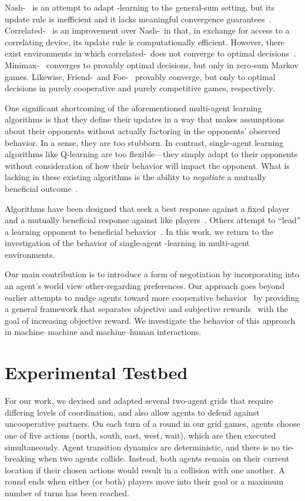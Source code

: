 \documentclass[letterpaper]{article}
\begin{document}
Nash-\Q~\cite{hu03} is an attempt to adapt \Q-learning to the
general-sum setting, but its update rule is inefficient and it lacks
meaningful convergence guarantees~\cite{bowling00,littman01d}.
Correlated-\Q~\cite{greenwald03} is an improvement over Nash-\Q\ in
that, in exchange for access to a correlating device, its update rule
is computationally efficient.  However, there exist environments in
which correlated-\Q\ does not converge to optimal
decisions~\cite{zinkevich05}.  Minimax-\Q~\cite{littman94b} converges
to provably optimal decisions, but only in zero-sum Markov games.
Likewise, Friend-\Q\ and Foe-\Q~\cite{littman01d} provably converge,
but only to optimal decisions in purely cooperative and purely
competitive games, respectively.

One significant shortcoming of the aforementioned multi-agent learning
algorithms is that they define their updates in a way that makes
assumptions about their opponents without actually factoring in the
opponents' observed behavior. In a sense, they are too stubborn. In
contrast, single-agent learning algorithms like Q-learning are too
flexible---they simply adapt to their opponents without consideration
of how their behavior will impact the opponent. What is lacking in
these existing algorithms is the ability to \emph{negotiate} a
mutually beneficial outcome~\cite{gal04}.

Algorithms have been designed that seek a best response against a
fixed player and a mutually beneficial response against like
players~\cite{conitzer07,bowling02}. Others attempt to ``lead'' a
learning opponent to beneficial behavior~\cite{littman01h}. In this
work, we return to the investigation of the behavior of
single-agent \Q-learning in multi-agent environments.

Our main contribution is to introduce a form of negotiation by
incorporating into an agent's world view other-regarding preferences.
Our approach goes beyond earlier attempts to nudge agents toward more
cooperative behavior~\cite{babes08} by providing a general framework
that separates objective and subjective rewards~\cite{singh10} with
the goal of increasing objective reward. We investigate the behavior
of this approach in machine--machine and machine--human interactions.

\section{Experimental Testbed}

For our work, we devised and adapted several two-agent grids that
require differing levels of coordination, and also allow agents to
defend against uncooperative partners. On each turn of a round in our
grid games, agents choose one
of five actions (north, south, east, west, wait), which are then
executed simultaneously. Agent transition dynamics are deterministic,
and there is no tie-breaking when two agents collide. Instead, both
agents remain on their current location if their chosen actions would
result in a collision with one another. A round ends when either (or both) players move into their goal or a maximum number of turns has been reached.
\end{document}
